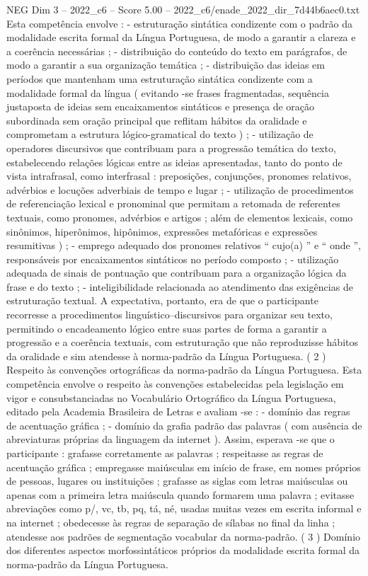 \begin{textsample}{NEG Dim 3 – 2022\_c6 – Score 5.00 – 2022\_c6/enade\_2022\_dir\_7d44b6aec0.txt}
Esta competência envolve : - estruturação sintática condizente com o padrão da modalidade escrita formal da Língua Portuguesa, de modo a garantir a clareza e a coerência necessárias ; - distribuição do conteúdo do texto em parágrafos, de modo a garantir a sua organização temática ; - distribuição das ideias em períodos que mantenham uma estruturação sintática condizente com a modalidade formal da língua ( evitando -se frases fragmentadas, sequência justaposta de ideias sem encaixamentos sintáticos e presença de oração subordinada sem oração principal que reflitam hábitos da oralidade e comprometam a estrutura lógico-gramatical do texto ) ; - utilização de operadores discursivos que contribuam para a progressão temática do texto, estabelecendo relações lógicas entre as ideias apresentadas, tanto do ponto de vista intrafrasal, como interfrasal : preposições, conjunções, pronomes relativos, advérbios e locuções adverbiais de tempo e lugar ; - utilização de procedimentos de referenciação lexical e pronominal que permitam a retomada de referentes textuais, como pronomes, advérbios e artigos ; além de elementos lexicais, como sinônimos, hiperônimos, hipônimos, expressões metafóricas e expressões resumitivas ) ; - emprego adequado dos pronomes relativos “ cujo(a) ” e “ onde ”, responsáveis por encaixamentos sintáticos no período composto ; - utilização adequada de sinais de pontuação que contribuam para a organização lógica da frase e do texto ; - inteligibilidade relacionada ao atendimento das exigências de estruturação textual.
A expectativa, portanto, era de que o participante recorresse a procedimentos linguístico–discursivos para organizar seu texto, permitindo o encadeamento lógico entre suas partes de forma a garantir a progressão e a coerência textuais, com estruturação que não reproduzisse hábitos da oralidade e sim atendesse à norma-padrão da Língua Portuguesa. ( 2 ) Respeito às convenções ortográficas da norma-padrão da Língua Portuguesa.
Esta competência envolve o respeito às convenções estabelecidas pela legislação em vigor e consubstanciadas no Vocabulário Ortográfico da Língua Portuguesa, editado pela Academia Brasileira de Letras e avaliam -se : - domínio das regras de acentuação gráfica ; - domínio da grafia padrão das palavras ( com ausência de abreviaturas próprias da linguagem da internet ).
Assim, esperava -se que o participante : grafasse corretamente as palavras ; respeitasse as regras de acentuação gráfica ; empregasse maiúsculas em início de frase, em nomes próprios de pessoas, lugares ou instituições ; grafasse as siglas com letras maiúsculas ou apenas com a primeira letra maiúscula quando formarem uma palavra ; evitasse abreviações como p/, vc, tb, pq, tá, né, usadas muitas vezes em escrita informal e na internet ; obedecesse às regras de separação de sílabas no final da linha ; atendesse aos padrões de segmentação vocabular da norma-padrão. ( 3 ) Domínio dos diferentes aspectos morfossintáticos próprios da modalidade escrita formal da norma-padrão da Língua Portuguesa.

\end{textsample}
